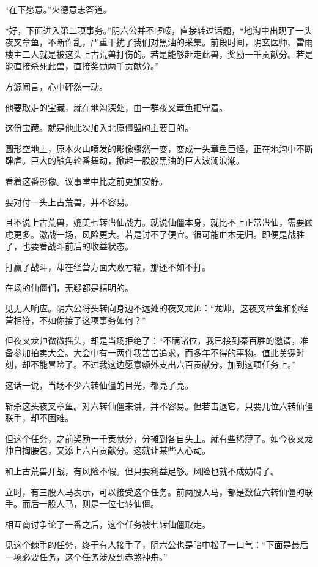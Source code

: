 \begin{this_body}
“在下愿意。”火德意志答道。

“好，下面进入第二项事务。”阴六公并不啰嗦，直接转过话题，“地沟中出现了一头夜叉章鱼，不断作乱，严重干扰了我们对黑油的采集。前段时间，阴玄医师、雷雨楼主二人就是被这头上古荒兽打伤的。若是能够赶走此兽，奖励一千贡献分。若是能直接杀死此兽，直接奖励两千贡献分。”

方源闻言，心中砰然一动。

他要取走的宝藏，就在地沟深处，由一群夜叉章鱼把守着。

这份宝藏。就是他此次加入北原僵盟的主要目的。

圆形空地上，原本火山喷发的影像骤然一变，变成一头章鱼巨怪，正在地沟中不断肆虐。巨大的触角轮番舞动，掀起一股股黑油的巨大波澜浪潮。

看着这番影像。议事堂中比之前更加安静。

要对付一头上古荒兽，并不容易。

且不说上古荒兽，媲美七转蛊仙战力。就说仙僵本身，就比不上正常蛊仙，需要顾虑更多。激战一场，风险更大。若是讨不了便宜。很可能血本无归。即便是战胜了，也要看战斗前后的收益状态。

打赢了战斗，却在经营方面大败亏输，那还不如不打。

在场的仙僵们，无疑都是精明的。

见无人响应。阴六公将头转向身边不远处的夜叉龙帅：“龙帅，这夜叉章鱼和你经营相符，不如你接了这项事务如何？”

但夜叉龙帅微微摇头，却是当场拒绝了：“不瞒诸位，我已接到秦百胜的邀请，准备参加拍卖大会。大会中有一两件我苦苦追求，而多年不得的事物。值此关键时刻，却不能冒险了。不过我这边愿意额外支出六百贡献分。加到这项任务上。”

这话一说，当场不少六转仙僵的目光，都亮了亮。

斩杀这头夜叉章鱼。对六转仙僵来讲，并不容易。但若击退它，只要几位六转仙僵联手，却不困难。

但这个任务，之前奖励一千贡献分，分摊到各自头上。就有些稀薄了。如今夜叉龙帅自掏腰包，又添上六百贡献分。这就让某些人心动。

和上古荒兽开战，有风险不假。但只要利益足够。风险也就不成妨碍了。

立时，有三股人马表示，可以接受这个任务。前两股人马，都是数位六转仙僵的联手。而后一股人马，则是一位七转仙僵。

相互商讨争论了一番之后，这个任务被七转仙僵取走。

见这个棘手的任务，终于有人接手了，阴六公也是暗中松了一口气：“下面是最后一项必要任务，这个任务涉及到赤煞神舟。”


\end{this_body}
